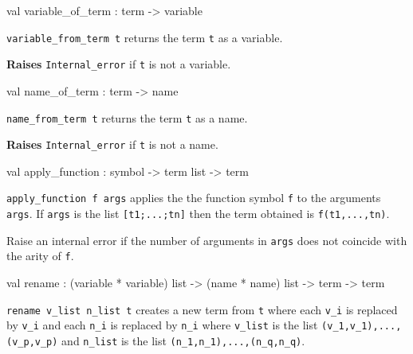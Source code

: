 \label{val:Term.variable-underscoreof-underscoreterm}\begin{ocamldoccode}
val variable_of_term : term -> variable
\end{ocamldoccode}
\begin{ocamldocdescription}
{\tt{variable\_from\_term t}} returns the term {\tt{t}} as a variable.

{\bf Raises} {\tt{Internal\_error}} if {\tt{t}} is not a variable.


\end{ocamldocdescription}




\label{val:Term.name-underscoreof-underscoreterm}\begin{ocamldoccode}
val name_of_term : term -> name
\end{ocamldoccode}
\begin{ocamldocdescription}
{\tt{name\_from\_term t}} returns the term {\tt{t}} as a name.

{\bf Raises} {\tt{Internal\_error}} if {\tt{t}} is not a name.


\end{ocamldocdescription}




\label{val:Term.apply-underscorefunction}\begin{ocamldoccode}
val apply_function : symbol -> term list -> term
\end{ocamldoccode}
\begin{ocamldocdescription}
{\tt{apply\_function f args}} applies the the function symbol {\tt{f}} to the arguments {\tt{args}}.
    If {\tt{args}} is the list {\tt{[t1;...;tn]}} then the term obtained is {\tt{f(t1,...,tn)}}.


    \lowdebug  Raise an internal error if the number of arguments in {\tt{args}} does not coincide
    with the arity of {\tt{f}}.


\end{ocamldocdescription}




\label{val:Term.rename}\begin{ocamldoccode}
val rename :
  (variable * variable) list ->
  (name * name) list -> term -> term
\end{ocamldoccode}
\begin{ocamldocdescription}
{\tt{rename v\_list n\_list t}} creates a new term from {\tt{t}} where each {\tt{v\_i}} is replaced by {\tt{v{\textquotesingle}\_i}}
    and each {\tt{n\_i}} is replaced by {\tt{n{\textquotesingle}\_i}} where {\tt{v\_list}} is the list {\tt{(v\_1,v{\textquotesingle}\_1),...,(v\_p,v{\textquotesingle}\_p)}}
    and {\tt{n\_list}} is the list {\tt{(n\_1,n{\textquotesingle}\_1),...,(n\_q,n{\textquotesingle}\_q)}}.


\end{ocamldocdescription}




